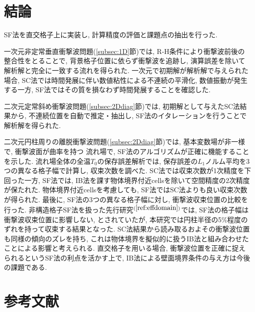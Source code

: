 \documentclass[a4j]{jarticle}
\begin{document}
\section{結論} \label{sec:conclusion}

SF法を直交格子上に実装し, 計算精度の評価と課題点の抽出を行った.

一次元非定常垂直衝撃波問題(\ref{subsec:1D}節)では, R-H条件により衝撃波前後の整合性をとることで,
背景格子位置に依らず衝撃波を追跡し, 演算誤差を除いて解析解と完全に一致する流れを得られた.
一次元で初期解が解析解で与えられた場合, SC法では時間発展に伴い数値粘性による不連続の平滑化, 数値振動が発生する一方, 
SF法ではその質を損なわず時間発展することを確認した.

二次元定常斜め衝撃波問題(\ref{subsec:2Ddiag}節)では, 初期解として与えたSC法結果から,
不連続位置を自動で推定・抽出し, SF法のイタレーションを行うことで解析解を得られた.

二次元円柱周りの離脱衝撃波問題(\ref{subsec:2Ddiag}節)では, 基本変数場が非一様で, 衝撃波面が曲率を持つ
流れ場で, SF法のアルゴリズムが正確に機能することを示した. 
流れ場全体の全温$T_0$の保存誤差解析では, 保存誤差の$L_1$ノルム平均を3つの異なる格子幅で計算し, 収束次数を調べた.
SC法では収束次数が1次精度を下回った一方, SF法では, IB法を課す物体境界付近cellsを除いて空間精度の2次精度が保たれた.
物体境界付近cellsを考慮しても, SF法ではSC法よりも良い収束次数が得られた.
最後に, SF法の3つの異なる格子幅に対し, 衝撃波収束位置の比較を行った.
非構造格子SF法を扱った先行研究$^{(\ref{ref:effdomain})}$では, SF法の格子幅は
衝撃波収束位置に影響しない, とされていたが, 本研究では円柱半径の5\%程度のずれを持って収束する結果となった.
SC法結果から読み取るおよその衝撃波位置も同様の傾向のズレを持ち, 
これは物体境界を擬似的に扱うIB法と組み合わせたことによる影響と考えられる.
直交格子を用いる場合, 衝撃波位置を正確に捉えられるというSF法の利点を活かす上で, 
IB法による壁面境界条件の与え方は今後の課題である. 
\section*{参考文献}
\end{document}
